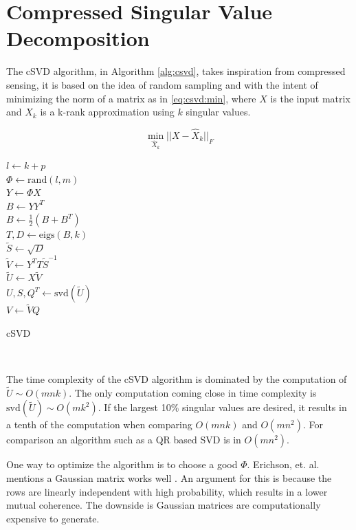\section{Compressed Singular Value Decomposition}

The cSVD algorithm, in Algorithm \ref{alg:csvd}, takes inspiration from compressed sensing, it is based on the idea of random sampling and with the intent of minimizing the norm of a matrix as in \eqref{eq:csvd:min}, where $X$ is the input matrix and $X_k$ is a k-rank approximation using $k$ singular values.

\begin{equation}
  \label{eq:csvd:min}
  \min_{\hat X_k} || X - \hat X_k ||_F
\end{equation}

\begin{algorithm}[H]
  \label{alg:csvd}
\SetAlgoLined
{}
$l \gets k + p$ \\
$\Phi \gets \mathrm{rand}(l, m)$ \\
$Y \gets \Phi X$ \\
$B \gets Y Y^T$ \\
$B \gets \frac{1}{2}(B + B^T)$ \\
$T,D \gets \mathrm{eigs}(B,k)$ \\
$\tilde S \gets \sqrt{D}$ \\
$\tilde V \gets Y^T T \tilde S^{-1}$ \\
$\tilde U \gets X \tilde V$ \\
$U,S,Q^T \gets \mathrm{svd}(\tilde U)$ \\
$V \gets \tilde V Q$ \\
\caption{cSVD}
\end{algorithm}

$ $ \newline

The time complexity of the cSVD algorithm is dominated by the computation of $\tilde U \sim O(mnk)$. The only computation coming close in time complexity is $\mathrm{svd}(\tilde U) \sim O(mk^2)$. If the largest 10\% singular values are desired, it results in a tenth of the computation when comparing $O(mnk)$ and $O(mn^2)$. For comparison an algorithm such as a QR based SVD is in $O(mn^2)$.

One way to optimize the algorithm is to choose a good $\Phi$. Erichson, et. al. mentions a Gaussian matrix works well \cite{erichson:csvd}. An argument for this is because the rows are linearly independent with high probability, which results in a lower mutual coherence. The downside is Gaussian matrices are computationally expensive to generate.

